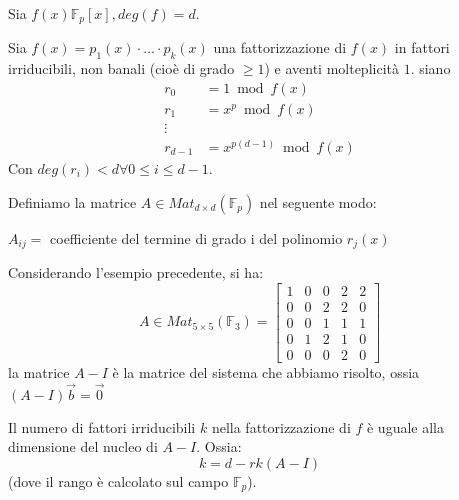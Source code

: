 \documentclass[../main.tex]{subfiles}
\begin{document}
Sia $f(x) \mathbb{F}_p[x], deg(f) = d$.

Sia $f(x) = p_1(x)\cdot \ldots \cdot p_k(x)$ una fattorizzazione di $f(x)$ in fattori irriducibili, non banali (cioè di grado $\geq 1$) e aventi molteplicità $1$. siano
\begin{align*}
    r_0       & = 1 \bmod f(x)            \\
    r_1       & = x^p \bmod f(x)          \\
    \vdots    &                           \\
    r_{d - 1} & = x^{p(d - 1)} \bmod f(x)
\end{align*}
Con $deg(r_i) < d \forall 0 \leq i \leq d - 1$.

Definiamo la matrice $A \in Mat_{d \times d}(\mathbb{F}_p)$ nel seguente modo:

$A_{ij} = $ coefficiente del termine di grado i del polinomio $r_j(x)$
\begin{example}
    Considerando l'esempio precedente, si ha:
    \begin{equation*}
        A \in Mat_{5 \times 5}(\mathbb{F}_3) =
        \begin{bmatrix}
            1 & 0 & 0 & 2 & 2 \\
            0 & 0 & 2 & 2 & 0 \\
            0 & 0 & 1 & 1 & 1 \\
            0 & 1 & 2 & 1 & 0 \\
            0 & 0 & 0 & 2 & 0
        \end{bmatrix}
    \end{equation*}
    la matrice $A - I$ è la matrice del sistema che abbiamo risolto, ossia $(A - I)\overrightarrow{b} = \overrightarrow{0}$
\end{example}

\begin{theorem}
    Il numero di fattori irriducibili $k$ nella fattorizzazione di $f$ è uguale alla dimensione del nucleo di $A - I$. Ossia:
    \begin{equation*}
        k = d - rk(A - I)
    \end{equation*}
    (dove il rango è calcolato sul campo $\mathbb{F}_p$).
\end{theorem}
\end{document}
